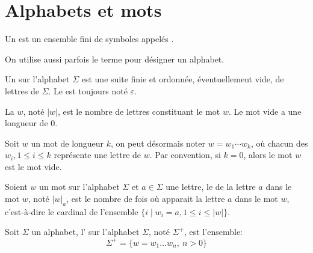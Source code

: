 \section{Alphabets et mots}

\begin{definition}
	Un  est un ensemble fini de symboles appelés .
\end{definition}

On utilise aussi parfois le terme  pour désigner un alphabet.

\begin{definition}
	Un  sur l'alphabet \( \Sigma \) est une suite finie et ordonnée, éventuellement vide, de lettres de \( \Sigma \). Le  est toujours noté \( \varepsilon\).
\end{definition}

\begin{definition}
	La  \( w \), noté \( |w| \), est le nombre de lettres constituant le mot \( w \). Le mot vide a une longueur de 0.
\end{definition}

Soit \( w \) un mot de longueur \( k \), on peut désormais noter \( w = w_1 \cdots w_k \), où chacun des \( w_i, 1 \leq i \leq k \) représente une lettre de \( w \). Par convention, si \( k = 0 \), alors le mot \( w \) est le mot vide.

\begin{definition}
	Soient \( w \) un mot sur l'alphabet \( \Sigma \) et \( a \in \Sigma \) une lettre, le  de la lettre \( a \) dans le mot \( w \), noté \( |w|_a \), est le nombre de fois où apparait la lettre \( a \) dans le mot \( w \), c'est-à-dire le cardinal de l'ensemble \( \{ i \mid w_i = a, 1 \leq i \leq |w| \} \).
\end{definition}

\begin{definition}
	Soit \( \Sigma \) un alphabet, l' sur l'alphabet \( \Sigma \), noté \( \Sigma^+ \), est l'ensemble:
	\begin{equation}
		\Sigma^+ = \{ w = w_1 \ldots w_n,~ n > 0 \}
	\end{equation}
\end{definition}

